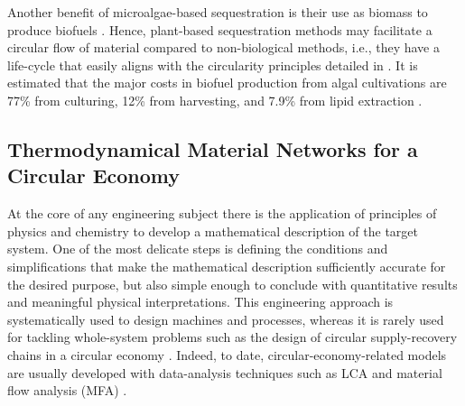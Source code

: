 Another benefit of microalgae-based sequestration is their use as biomass to produce biofuels \cite{arun2021technical}. Hence, plant-based sequestration methods may facilitate a circular flow of material compared to non-biological methods, i.e., they have a life-cycle that easily aligns with the circularity principles detailed in \cite{suarez2019operational}. It is estimated that the major costs in biofuel production from algal cultivations are 77\% from culturing, 12\% from harvesting, and 7.9\% from lipid extraction \cite{sarwer2022algal}.   


 

     





\subsection{Thermodynamical Material Networks for a Circular Economy}
At the core of any engineering subject there is the application of principles of physics and chemistry to develop a mathematical description of the target system. One of the most delicate steps is defining the conditions and simplifications that make the mathematical description sufficiently accurate for the desired purpose, but also simple enough to conclude with quantitative results and meaningful physical interpretations. This engineering approach is systematically used to design machines and processes, whereas it is rarely used for tackling whole-system problems such as the design of circular supply-recovery chains in a circular economy \cite{EMAFund}. Indeed, to date, circular-economy-related models are usually developed with data-analysis techniques such as LCA \cite{amicarelli2022life,walker2020life,xia2022review,cucurachi2019life,sala2021evolution} and material flow analysis (MFA) \cite{luan2021dynamic,li2022uncovering,sieber2020dynamic,liu2021dynamic,eriksen2020dynamic}. 

